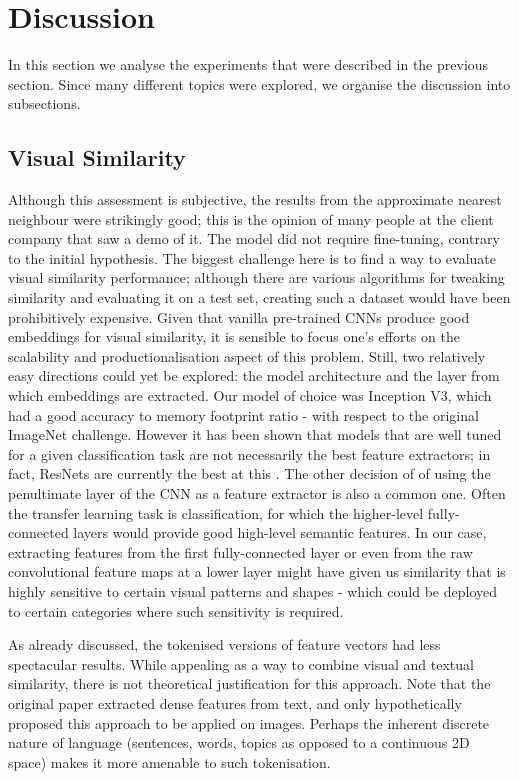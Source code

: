 \chapter{Discussion}
\label{disc}

In this section we analyse the experiments that were described in the previous section.
Since many different topics were explored, we organise the discussion into subsections.

\section{Visual Similarity}

Although this assessment is subjective, the results from the approximate nearest neighbour were strikingly good; this is the opinion of many people at the client company that saw a demo of it.
The model did not require fine-tuning, contrary to the initial hypothesis.
The biggest challenge here is to find a way to evaluate visual similarity performance; although there are various algorithms for tweaking similarity and evaluating it on a test set, creating such a dataset would have been prohibitively expensive.
Given that vanilla pre-trained CNNs produce good embeddings for visual similarity, it is sensible to focus one's efforts on the scalability and productionalisation aspect of this problem.
Still, two relatively easy directions could yet be explored: the model architecture and the layer from which embeddings are extracted.
Our model of choice was Inception V3, which had a good accuracy to memory footprint ratio - with respect to the original ImageNet challenge.
However it has been shown that models that are well tuned for a given classification task are not necessarily the best feature extractors; in fact, ResNets are currently the best at this \cite{img_feature_extract}.
The other decision of of using the penultimate layer of the CNN as a feature extractor is also a common one.
Often the transfer learning task is classification, for which the higher-level fully-connected layers would provide good high-level semantic features.
In our case, extracting features from the first fully-connected layer or even from the raw convolutional feature maps at a lower layer might have given us similarity that is highly sensitive to certain visual patterns and shapes - which could be deployed to certain categories where such sensitivity is required.

As already discussed, the tokenised versions of feature vectors had less spectacular results.
While appealing as a way to combine visual and textual similarity, there is not theoretical justification for this approach.
Note that the original paper \cite{vec_fulltext} extracted dense features from text, and only hypothetically proposed this approach to be applied on images.
Perhaps the inherent discrete nature of language (sentences, words, topics as opposed to a continuous 2D space)  makes it more amenable to such tokenisation.

